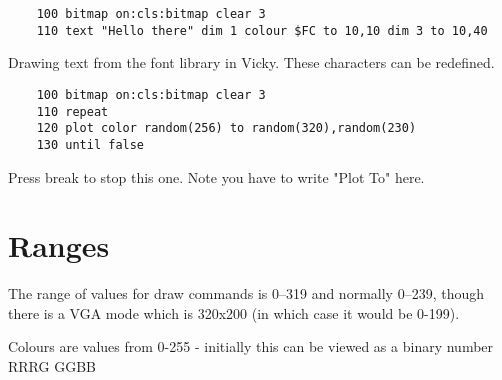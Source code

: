 \begin{verbatim}
	100 bitmap on:cls:bitmap clear 3
	110 text "Hello there" dim 1 colour $FC to 10,10 dim 3 to 10,40	
\end{verbatim}

Drawing text from the font library in Vicky. These characters can be redefined.

\begin{verbatim}
	100 bitmap on:cls:bitmap clear 3
	110 repeat
	120 plot color random(256) to random(320),random(230)
	130 until false
\end{verbatim}

Press break to stop this one. Note you have to write "Plot To" here.

\section{Ranges}
The range of values for draw commands is 0–319 and normally 0–239, though there is a VGA mode which is 320x200 (in which case it would be 0-199).

Colours are values from 0-255 - initially this can be viewed as a binary number RRRG GGBB
